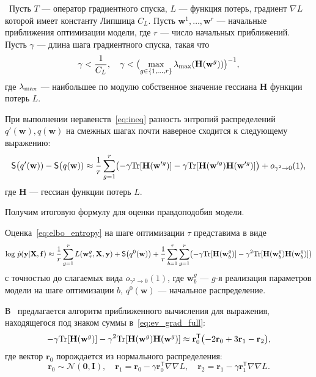 ~Пусть $T$ --- оператор градиентного спуска,
 $L$ --- функция потерь, градиент $\nabla L$ которой имеет константу Липшица $C_L$.  Пусть $\mathbf{w}^1,\dots,\mathbf{w}^r$ ---  начальные приближения оптимизации модели, где $r$ --- число начальных приближений. Пусть $\gamma$ --- длина шага градиентного спуска, такая что
\begin{equation}
\label{eq:ineq}
\gamma<\frac{1}{C_L}, \quad \gamma < \bigl(\max_{g \in \{1,\dots,r\}}\lambda_\textnormal{max} (\mathbf{H}(\mathbf{w}^g))\bigr)^{-1}, 
\end{equation}
где $\lambda_\textnormal{max}$ --- наибольшее по модулю собственное значение гессиана  $\mathbf{H}$ функции потерь $L$.

При выполнении неравенств~\eqref{eq:ineq} разность энтропий распределений $q'(\mathbf{w}), q(\mathbf{w})$ на смежных шагах почти наверное сходится к следующему выражению: 
\begin{equation}
\label{eq:entropy}
	\mathsf{S}\bigl(q'(\mathbf{w})) -  \mathsf{S}\bigl(q(\mathbf{w}))  \approx  \frac{1}{r}\sum_{g=1}^r \bigl(-\gamma \textnormal{Tr}[\mathbf{H}(\mathbf{w}'^g)] - \gamma \textnormal{Tr}[\mathbf{H}(\mathbf{w}'^g)\mathbf{H}(\mathbf{w}'^g)]  \bigr) + o_{\gamma^2 \to 0}(1),
\end{equation}
где $\mathbf{H}$ --- гессиан функции потерь $L$.


Получим итоговую формулу для оценки правдоподобия модели.

Оценка~\eqref{eq:elbo_entropy} на шаге оптимизации $\tau$ представима в виде
\begin{equation}
\label{eq:ev_grad_full}
\textnormal{log}~\hat{p}(\mathbf{y}|\mathbf{X}, \mathbf{f}) \approx \frac{1}{r} \sum_{g = 1}^r L(\mathbf{w}^g_\tau, \mathbf{X}, \mathbf{y})  + \mathsf{S}\big(q^0(\mathbf{w})\bigr) + \frac{1}{r}\sum_{b=1}^\tau\sum_{g=1}^r \bigl(-\gamma \textnormal{Tr}[\mathbf{H}(\mathbf{w}_b^g)] - \gamma^2 \textnormal{Tr}[\mathbf{H}(\mathbf{w}_b^g)\mathbf{H}(\mathbf{w}_b^g)]  \bigr) 
\end{equation}
с точностью до слагаемых вида $o_{\gamma^2 \to 0}(1)$,
где $\mathbf{w}_b^g$ --- $g$-я реализация параметров модели на шаге оптимизации $b$, $q^0(\mathbf{w})$ --- начальное распределение.



В~\cite{early} предлагается алгоритм приближенного вычисления для выражения, находящегося под знаком суммы в~\eqref{eq:ev_grad_full}:
\[
	-\gamma \textnormal{Tr}[\mathbf{H}(\mathbf{w}^g)] - \gamma^2 \textnormal{Tr}[\mathbf{H}(\mathbf{w}^g)\mathbf{H}(\mathbf{w}^g)]  \approx \mathbf{r}_0^\mathsf{T}\bigl(-2\mathbf{r}_0 + 3\mathbf{r}_1 -\mathbf{r}_2\bigr),
\]
где вектор $\mathbf{r}_0$  порождается из нормального распределения:
$$\mathbf{r}_0 \sim \mathcal{N}(\mathbf{0}, \mathbf{I}), \quad \mathbf{r}_1 = \mathbf{r}_0 - \gamma \mathbf{r}_0^\mathsf{T} \nabla \nabla L, \quad \mathbf{r}_2 = \mathbf{r}_1 - \gamma \mathbf{r}_1^\mathsf{T} \nabla \nabla L.$$


